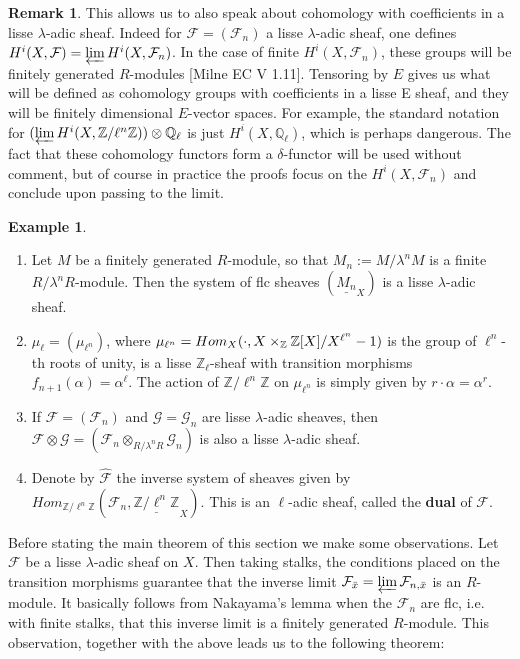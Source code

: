 \documentclass{ucbthesis}
\theoremstyle{definition}
\newtheorem{rmk}[thm]{Remark}
\newtheorem{exm}[thm]{Example}
\theoremstyle{theorem}
\begin{document}
\begin{rmk}
This allows us to also speak about cohomology with coefficients in a lisse $\lambda$-adic sheaf. Indeed for $\mathcal{F}= (\mathcal{F}_n)$ a lisse $\lambda$-adic sheaf, one defines $H^{i}(X,\mathcal{F}) = \varprojlim H^{i}(X,\mathcal{F}_{n})$. In the case of finite $H^{i}(X,\mathcal{F}_{n})$, these groups will be finitely generated $R$-modules [Milne EC V 1.11]. Tensoring by $E$ gives us what will be defined as cohomology groups with coefficients in a lisse E sheaf, and they will be finitely dimensional $E$-vector spaces. For example, the standard notation for $(\varprojlim H^{i}(X,\mathbb{Z}/\ell^{n}\mathbb{Z}))\otimes \mathbb{Q}_{\ell}$ is just $H^{i}(X,\mathbb{Q}_{\ell})$, which is perhaps dangerous. The fact that these cohomology functors form a $\delta$-functor will be used without comment, but of course in practice the proofs focus on the $H^{i}(X,\mathcal{F}_{n})$ and conclude upon passing to the limit. 
\end{rmk}

\begin{exm}
\begin{enumerate}
\item Let $M$ be a finitely generated $R$-module, so that $M_{n}:= M/\lambda^{n}M$ is a finite $R/\lambda^{n}R$-module. Then the system of flc sheaves $(\underline{M_{n}}_{X})$ is a lisse $\lambda$-adic sheaf. 
\item $\mu_{\ell} = (\mu_{\ell^{n}})$, where $\mu_{\ell^{n}} = Hom_{X}(\cdot, \tiny{X\times_{\mathbb{Z}}\mathbb{Z}[X]/X^{\ell^{n}}-1})$ is the group of $\ell^{n}$-th roots of unity, is a lisse $\mathbb{Z}_{\ell}$-sheaf with transition morphisms $f_{n+1}(\alpha) = \alpha^{\ell}$. The action of $\mathbb{Z}/{\ell^{n}\mathbb{Z}}$ on $\mu_{\ell^{n}}$ is simply given by $r\cdot \alpha = \alpha^{r}$. 
\item If $\mathcal{F} = (\mathcal{F}_{n})$ and $\mathcal{G}=\mathcal{G}_{n}$ are lisse $\lambda$-adic sheaves, then $\mathcal{F}\otimes \mathcal{G} =(\mathcal{F}_{n}\otimes_{R/\lambda^{n}R}\mathcal{G}_{n})$ is also a lisse $\lambda$-adic sheaf. 
\item Denote by $\hat{\mathcal{F}}$ the inverse system of sheaves given by $Hom_{\mathbb{Z}/\ell^{n}\mathbb{Z}}(\mathcal{F}_{n},\underline{\mathbb{Z}/\ell^{n}\mathbb{Z}}_{X})$. This is an $\ell$-adic sheaf, called the \textbf{dual} of $\mathcal{F}$. 
\end{enumerate}
\end{exm}

Before stating the main theorem of this section we make some observations. Let $\mathcal{F}$ be a lisse $\lambda$-adic sheaf on $X$. Then taking stalks, the conditions placed on the transition morphisms guarantee that the inverse limit $\mathcal{F}_{\bar{x}} = \varprojlim \mathcal{F}_{n,\bar{x}}$ is an $R$-module. It basically follows from Nakayama's lemma when the $\mathcal{F}_{n}$ are flc, i.e. with finite stalks, that this inverse limit is a finitely generated $R$-module. This observation, together with the above leads us to the following theorem:
\end{document}
